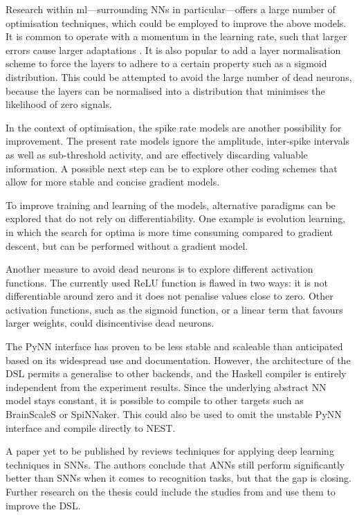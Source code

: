 \documentclass[report.tex]{subfiles}
\begin{document}
Research within \gls{ml}---surrounding \glspl{NN} in particular---offers a large
number of optimisation techniques, which could be employed to improve the above
models.
It is common to operate with a momentum in the learning rate, such that
larger errors cause larger adaptations \cite{Montavon1998, Sutskever2013}.
It is also popular to add a layer normalisation scheme to force the layers to
adhere to a certain property such as a sigmoid distribution.
This could be attempted to avoid the large number of dead neurons, because the
layers can be normalised into a distribution that minimises the likelihood of
zero signals.

In the context of optimisation, the spike rate models are another possibility
for improvement.
The present rate models ignore the amplitude, inter-spike intervals as well as
sub-threshold activity, and are effectively discarding valuable information.
A possible next step can be to explore other coding schemes that
allow for more stable and concise gradient models.

To improve training and learning of the models, alternative paradigms can be explored that do not
rely on differentiability. 
One example is evolution learning, in which the search for optima is more time 
consuming compared to gradient descent, but can be performed without a gradient model.

Another measure to avoid dead neurons is to explore different activation functions. 
The currently used ReLU function is flawed in two ways: it is not
differentiable around zero and it does not penalise values close to
zero.
Other activation functions, such as the sigmoid function, or a linear term
that favours larger weights, could disincentivise dead neurons.

The PyNN interface has proven to be less stable and scaleable than anticipated
based on its widespread use and documentation.
However, the architecture of the \gls{DSL} permits a generalise to other
backends, and the Haskell compiler is entirely independent from the experiment
results.
Since the underlying abstract \gls{NN} model stays constant, 
it is possible to compile to other targets such as BrainScaleS or
SpiNNaker.
This could also be used to omit the unstable PyNN interface and compile directly
to NEST.

A paper yet to be published by \citeauthor{Tavanaei2019} reviews
techniques for applying deep learning techniques in \glspl{SNN}.
The authors conclude that \glspl{ANN} still perform significantly better than
\glspl{SNN} when it comes to recognition tasks, but that the gap is closing.
Further research on the thesis could include the studies from
\citeauthor{Tavanaei2019} and use them to improve the \gls{DSL}.
\\[0.1cm]
\end{document}
